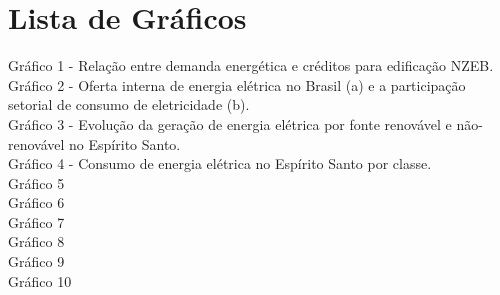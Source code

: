 \section*{Lista de Gráficos}
\vspace*{1.5cm} %
\thispagestyle{empty}
    \begin{onehalfspace}
        \footnotesize
        Gráfico 1 - Relação entre demanda energética e créditos para edificação NZEB.\\
        Gráfico 2 - Oferta interna de energia elétrica no Brasil (a) e a 
        participação setorial de consumo de eletricidade (b).\\
        Gráfico 3 - Evolução da geração de energia elétrica por fonte renovável e não-renovável no Espírito Santo.\\
        Gráfico 4 - Consumo de energia elétrica no Espírito Santo por classe.\\
        Gráfico 5\\
        Gráfico 6\\
        Gráfico 7\\
        Gráfico 8\\
        Gráfico 9\\
        Gráfico 10\\
    \end{onehalfspace}